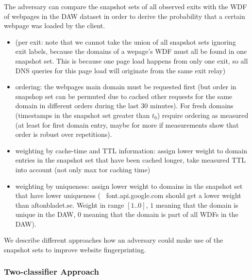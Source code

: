 The adversary can compare the snapshot sets of all observed exits with
the WDF of webpages in the DAW dataset in order to derive the
probability that a certain webpage was loaded by the client.

\begin{itemize}
  \item (per exit: note that we cannot take the union of all snapshot
		  sets ignoring exit labels, because the domains of a wepage's
		  WDF must all be found in one snapshot set. This is because one
		  page load happens from only one exit, so all DNS queries for
		  this page load will originate from the same exit relay)
  \item ordering: the webpages main domain must be requested first (but
		  order in snapshop set can be permuted due to cached other
		  requests for the same domain in different orders during the
		  last 30 minutes). For fresh domains (timestamps in the
		  snapshot set greater than $t_0$) require ordering as measured
		  (at least for first domain entry, maybe for more if
		  measurements show that order is robust over repetitions).
  \item weighting by cache-time and TTL information: assign lower weight
		  to domain entries in the snapshot set that have been cached
		  longer, take measured TTL into account (not only max tor
		  caching time)
  \item weighting by uniqueness: assign lower weight to domains in the
		  snapshot set that have lower uniqueness (\eg~
		  font.api.google.com should get a lower weight than
		  aftonbladet.se. Weight in range $[1..0]$, $1$ meaning that the
		  domain is unique in the DAW, $0$ meaning that the domain is
		  part of all WDFs in the DAW).
\end{itemize}

We describe different approaches how an adversary could make use of the
snapshot sets to improve website fingerprinting.

\subsubsection{Two-classifier Approach}

